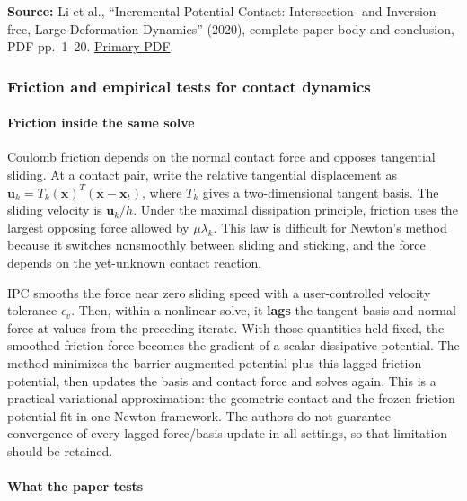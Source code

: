 \textbf{Source:} Li et al., ``Incremental Potential Contact: Intersection- and Inversion-free, Large-Deformation Dynamics'' (2020), complete paper body and conclusion, PDF pp.~1--20. \href{https://ipc-sim.github.io/file/IPC-paper-350ppi.pdf}{Primary PDF}.

\subsubsection{Friction and empirical tests for contact dynamics}\label{friction-and-empirical-tests-for-contact-dynamics}

\paragraph{Friction inside the same solve}\label{friction-inside-the-same-solve-1}

Coulomb friction depends on the normal contact force and opposes tangential sliding. At a contact pair, write the relative tangential displacement as \(\mathbf{u}_k=T_k(\mathbf{x})^T(\mathbf{x}-\mathbf{x}_t)\), where \(T_k\) gives a two-dimensional tangent basis. The sliding velocity is \(\mathbf{u}_k/h\). Under the maximal dissipation principle, friction uses the largest opposing force allowed by \(\mu\lambda_k\). This law is difficult for Newton's method because it switches nonsmoothly between sliding and sticking, and the force depends on the yet-unknown contact reaction.

IPC smooths the force near zero sliding speed with a user-controlled velocity tolerance \(\epsilon_v\). Then, within a nonlinear solve, it \textbf{lags} the tangent basis and normal force at values from the preceding iterate. With those quantities held fixed, the smoothed friction force becomes the gradient of a scalar dissipative potential. The method minimizes the barrier-augmented potential plus this lagged friction potential, then updates the basis and contact force and solves again. This is a practical variational approximation: the geometric contact and the frozen friction potential fit in one Newton framework. The authors do not guarantee convergence of every lagged force/basis update in all settings, so that limitation should be retained.

\paragraph{What the paper tests}\label{what-the-paper-tests-1}

